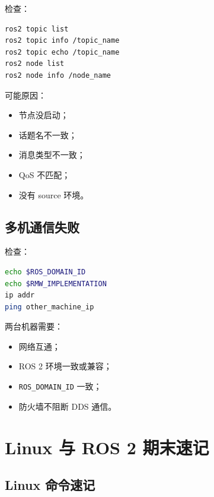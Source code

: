 \documentclass[UTF8,a4paper,12pt]{ctexart}
\begin{document}
检查：
\begin{lstlisting}[language=bash]
ros2 topic list
ros2 topic info /topic_name
ros2 topic echo /topic_name
ros2 node list
ros2 node info /node_name
\end{lstlisting}

可能原因：
\begin{itemize}
    \item 节点没启动；
    \item 话题名不一致；
    \item 消息类型不一致；
    \item QoS 不匹配；
    \item 没有 source 环境。
\end{itemize}

\subsection{多机通信失败}

检查：
\begin{lstlisting}[language=bash]
echo $ROS_DOMAIN_ID
echo $RMW_IMPLEMENTATION
ip addr
ping other_machine_ip
\end{lstlisting}

两台机器需要：
\begin{itemize}
    \item 网络互通；
    \item ROS 2 环境一致或兼容；
    \item \texttt{ROS\_DOMAIN\_ID} 一致；
    \item 防火墙不阻断 DDS 通信。
\end{itemize}

\section{Linux 与 ROS 2 期末速记}

\subsection{Linux 命令速记}
\end{document}
